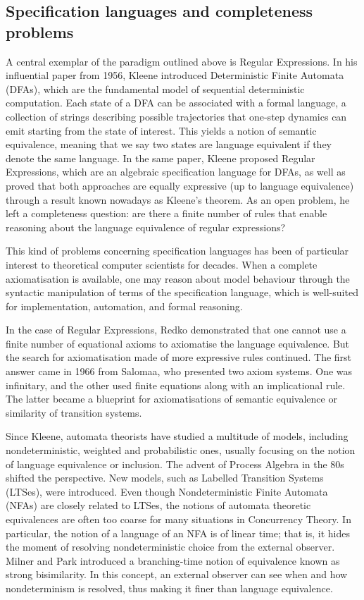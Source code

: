 \subsection{Specification languages and completeness problems}
A central exemplar of the paradigm outlined above is Regular Expressions. In his influential paper from 1956, Kleene introduced Deterministic Finite Automata (DFAs), which are the fundamental model of sequential deterministic computation. Each state of a DFA can be associated with a formal language, a collection of strings describing possible trajectories that one-step dynamics can emit starting from the state of interest. This yields a notion of semantic equivalence, meaning that we say two states are language equivalent if they denote the same language. In the same paper, Kleene proposed Regular Expressions, which are an algebraic specification language for DFAs, as well as proved that both approaches are equally expressive (up to language equivalence) through a result known nowadays as Kleene’s theorem. As an open problem, he left a completeness question: are there a finite number of rules that enable reasoning about the language equivalence of regular expressions? 

This kind of problems concerning specification languages has been of particular interest to theoretical computer scientists for decades. When a complete axiomatisation is available, one may reason about model behaviour through the syntactic manipulation of terms of the specification language, which is well-suited for implementation, automation, and formal reasoning.

In the case of Regular Expressions, Redko demonstrated that one cannot use a finite number of equational axioms to axiomatise the language equivalence. But the search for axiomatisation made of more expressive rules continued. The first answer came in 1966 from Salomaa, who presented two axiom systems. One was infinitary, and the other used finite equations along with an implicational rule. The latter became a blueprint for axiomatisations of semantic equivalence or similarity of transition systems.

Since Kleene, automata theorists have studied a multitude of models, including nondeterministic, weighted and probabilistic ones, usually focusing on the notion of language equivalence or inclusion. The advent of Process Algebra in the 80s shifted the perspective. New models, such as Labelled Transition Systems (LTSes), were introduced. Even though Nondeterministic Finite Automata (NFAs) are closely related to LTSes, the notions of automata theoretic equivalences are often too coarse for many situations in Concurrency Theory. In particular, the notion of a language of an NFA is of linear time; that is, it hides the moment of resolving nondeterministic choice from the external observer. Milner and Park introduced a branching-time notion of equivalence known as strong bisimilarity. In this concept, an external observer can see when and how nondeterminism is resolved, thus making it finer than language equivalence. 

